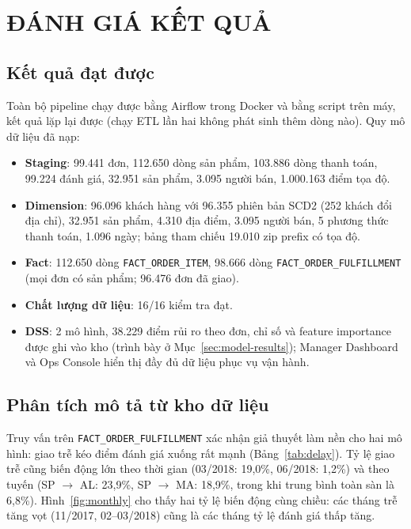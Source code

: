 \section{ĐÁNH GIÁ KẾT QUẢ}

\subsection{Kết quả đạt được}
\hspace{1cm}
Toàn bộ pipeline chạy được bằng Airflow trong Docker và bằng script trên máy, kết quả lặp lại
được (chạy ETL lần hai không phát sinh thêm dòng nào). Quy mô dữ liệu đã nạp:
\begin{itemize}
    \item \textbf{Staging}: 99.441 đơn, 112.650 dòng sản phẩm, 103.886 dòng thanh toán, 99.224
          đánh giá, 32.951 sản phẩm, 3.095 người bán, 1.000.163 điểm tọa độ.
    \item \textbf{Dimension}: 96.096 khách hàng với 96.355 phiên bản SCD2 (252 khách đổi địa
          chỉ), 32.951 sản phẩm, 4.310 địa điểm, 3.095 người bán, 5 phương thức thanh toán,
          1.096 ngày; bảng tham chiếu 19.010 zip prefix có tọa độ.
    \item \textbf{Fact}: 112.650 dòng \texttt{FACT\_ORDER\_ITEM}, 98.666 dòng
          \texttt{FACT\_ORDER\_FULFILLMENT} (mọi đơn có sản phẩm; 96.476 đơn đã giao).
    \item \textbf{Chất lượng dữ liệu}: 16/16 kiểm tra đạt.
    \item \textbf{DSS}: 2 mô hình, 38.229 điểm rủi ro theo đơn, chỉ số và feature importance được
          ghi vào kho (trình bày ở Mục~\ref{sec:model-results}); Manager Dashboard và Ops Console
          hiển thị đầy đủ dữ liệu phục vụ vận hành.
\end{itemize}

\subsection{Phân tích mô tả từ kho dữ liệu}
\hspace{1cm}
Truy vấn trên \texttt{FACT\_ORDER\_FULFILLMENT} xác nhận giả thuyết làm nền cho hai mô hình:
giao trễ kéo điểm đánh giá xuống rất mạnh (Bảng~\ref{tab:delay}). Tỷ lệ giao trễ cũng biến
động lớn theo thời gian (03/2018: 19,0\%, 06/2018: 1,2\%) và theo tuyến (SP $\to$ AL: 23,9\%,
SP $\to$ MA: 18,9\%, trong khi trung bình toàn sàn là 6,8\%). Hình~\ref{fig:monthly} cho thấy hai tỷ lệ
biến động cùng chiều: các tháng trễ tăng vọt (11/2017, 02--03/2018) cũng là các tháng tỷ lệ đánh giá
thấp tăng.

